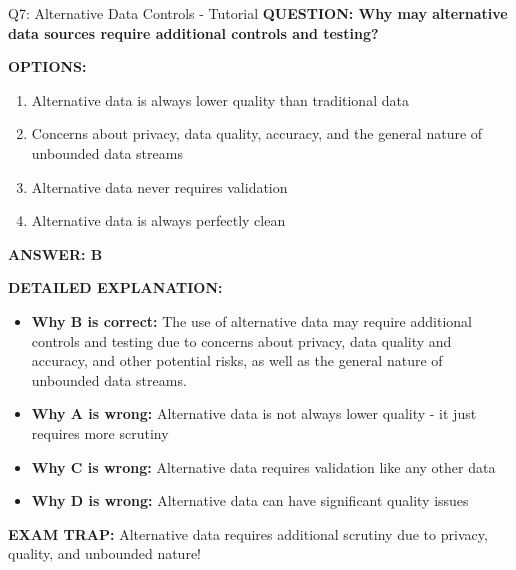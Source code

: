 \documentclass[8pt]{beamer}
\begin{document}
	\begin{frame}{Q7: Alternative Data Controls - Tutorial}
		\fontsize{6.5}{7.5}\selectfont
		\textbf{QUESTION: Why may alternative data sources require additional controls and testing?}
		
		\vspace{0.1cm}
		\textbf{OPTIONS:}
		\begin{enumerate}
			\item Alternative data is always lower quality than traditional data
			\item Concerns about privacy, data quality, accuracy, and the general nature of unbounded data streams
			\item Alternative data never requires validation
			\item Alternative data is always perfectly clean
		\end{enumerate}
		
		\vspace{0.1cm}
		\textcolor{myblue}{\textbf{ANSWER: B}}
		
		\vspace{0.1cm}
		\textbf{DETAILED EXPLANATION:}
		\begin{itemize}
			\item \textbf{Why B is correct:} The use of alternative data may require additional controls and testing due to concerns about privacy, data quality and accuracy, and other potential risks, as well as the general nature of unbounded data streams.
			\item \textbf{Why A is wrong:} Alternative data is not always lower quality - it just requires more scrutiny
			\item \textbf{Why C is wrong:} Alternative data requires validation like any other data
			\item \textbf{Why D is wrong:} Alternative data can have significant quality issues
		\end{itemize}
		
		\textcolor{myred}{\textbf{EXAM TRAP:}} Alternative data requires \textcolor{myblue}{additional scrutiny} due to privacy, quality, and unbounded nature!
	\end{frame}
	
\end{document}
